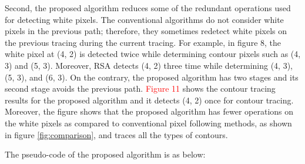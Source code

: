 Second, the proposed algorithm reduces some of the redundant operations used for detecting white pixels. The conventional algorithms do not consider white pixels in the previous path; therefore, they sometimes redetect white pixels on the previous tracing during the current tracing. For example, in figure 8, the white pixel at (4, 2) is detected twice while determining contour pixels such as (4, 3) and (5, 3). Moreover, RSA detects (4, 2) three time while determining (4, 3), (5, 3), and (6, 3). On the contrary, the proposed algorithm has two stages and its second stage avoids the previous path. \textcolor{red}{Figure 11} shows the contour tracing results for the proposed algorithm and it detects (4, 2) once for contour tracing. Moreover, the figure shows that the proposed algorithm has fewer operations on the white pixels as compared to conventional pixel following methods, as shown in figure \ref{fig:comparison}, and traces all the types of contours. 

The pseudo-code of the proposed algorithm is as below: 

